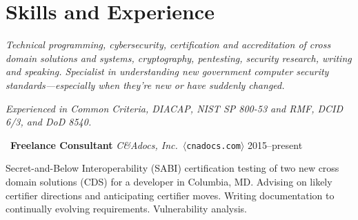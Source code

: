 \section*{Skills and Experience}

\vspace{-2mm}
\emph{Technical programming, cybersecurity, certification and accreditation
of cross domain solutions and systems, cryptography, pentesting, security
research, writing and speaking. Specialist in understanding new government
computer security standards---especially when they're new or have
suddenly changed.}

\vspace{2mm}
\noindent\emph{Experienced in Common Criteria, DIACAP, NIST SP 800-53
and RMF, DCID 6/3, and DoD 8540.}

\begin{comment}
\vspace{-2mm}
\begin{tabular*}{\textwidth}{ll}
    \hline
    \rule{0pt}{5mm}Cybersecurity Regulations & Specialist in understanding
        new government security standards, \\
        & especially when these are unfamiliar or have suddenly changed.
            \vspace{1.5mm} \\

    Technical Background & C and UNIX---including multi-level (CMW) programming and \\
        & security policies for Trusted Solaris, FreeBSD, or Linux. \vspace{1.5mm} \\

    \rule[-2mm]{0pt}{1em}All Current Standards & Common Criteria,
        DIACAP, NIST SP 800-53 security controls, \\
        & \rule[-3mm]{0pt}{0pt}DCID 6/3, and the new Risk Management Framework (RMF). \\

    \hline
\end{tabular*}
\end{comment}

\vspace{2mm}
\noindent\textbullet\ \textbf{Freelance Consultant}
    \hfill \emph{C\&Adocs, Inc.}\ $\langle$\nolinkurl{cnadocs.com}$\rangle$ \hfill 2015--present

    \vspace{1mm}
    \noindent Secret-and-Below Interoperability (SABI) certification
    testing of two new cross domain solutions (CDS) for a developer in
    Columbia, MD. Advising on likely certifier directions and anticipating
    certifier moves. Writing documentation to continually evolving
    requirements. Vulnerability analysis.

